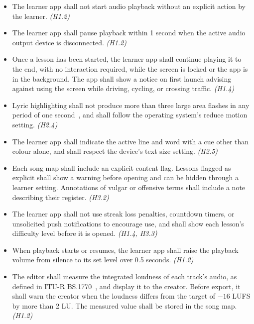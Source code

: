 \documentclass{article}
\begin{document}
\begin{itemize}
  \item[HS1.] The learner app shall not start audio playback without an
        explicit action by the learner. \emph{(H1.2)}
  \item[HS2.] The learner app shall pause playback within 1 second when the
        active audio output device is disconnected. \emph{(H1.2)}
  \item[HS3.] Once a lesson has been started, the learner app shall continue
        playing it to the end, with no interaction required, while the screen
        is locked or the app is in the background. The app shall show a notice
        on first launch advising against using the screen while driving,
        cycling, or crossing traffic. \emph{(H1.4)}
  \item[HS4.] Lyric highlighting shall not produce more than three large area
        flashes in any period of one second~\cite{WCAG231}, and shall follow
        the operating system's reduce motion setting. \emph{(H2.4)}
  \item[HS5.] The learner app shall indicate the active line and word with a
        cue other than colour alone, and shall respect the device's text size
        setting. \emph{(H2.5)}
  \item[HS6.] Each song map shall include an explicit content flag. Lessons
        flagged as explicit shall show a warning before opening and can be
        hidden through a learner setting. Annotations of vulgar or offensive
        terms shall include a note describing their register. \emph{(H3.2)}
  \item[HS7.] The learner app shall not use streak loss penalties, countdown
        timers, or unsolicited push notifications to encourage use, and shall
        show each lesson's difficulty level before it is opened.
        \emph{(H1.4, H3.3)}
  \item[HS8.] When playback starts or resumes, the learner app shall raise
        the playback volume from silence to its set level over 0.5 seconds.
        \emph{(H1.2)}
  \item[HS9.] The editor shall measure the integrated loudness of each
        track's audio, as defined in ITU-R BS.1770~\cite{BS1770}, and display
        it to the creator. Before export, it shall warn the creator when the
        loudness differs from the target of $-16$ LUFS by more than 2 LU. The
        measured value shall be stored in the song map. \emph{(H1.2)}
\end{itemize}
\end{document}

